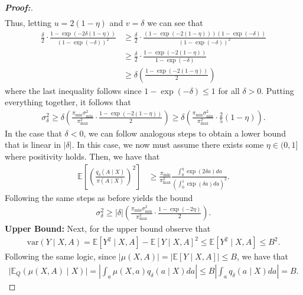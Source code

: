 \documentclass[11pt,twoside]{article}
\newcommand{\var}{\text{var}}
\theoremstyle{definition}
\theoremstyle{remark}
\begin{document}
\begin{proof}[\textbf{Proof:}]
\begin{align*}
\end{align*}
Thus, letting $u = 2(1 - \eta)$ and $v = \delta$ we can see that
\begin{align*}
    \frac{\delta}{2} \cdot \frac{1 - \exp(- 2 \delta(1 - \eta))}{(1 - \exp(- \delta))^2} &\geq \frac{\delta}{2} \cdot \frac{(1 - \exp(-2(1- \eta)))(1 - \exp(-\delta))}{(1 - \exp(- \delta))^2} \\
    &\geq \frac{\delta}{2} \cdot \frac{1 - \exp(-2(1- \eta))}{1 - \exp(- \delta)} \\
    &\geq  \delta \left( \frac{1 - \exp(-2(1- \eta))}{2} \right)
\end{align*}
where the last inequality follows since $1 - \exp(-\delta) \leq 1$ for all $\delta > 0$. Putting everything together, it follows that
\begin{align*}
    \sigma^2_\delta \geq \delta \left( \frac{\pi_{\min} \sigma^2_{\min}}{\pi^2_{\max}} \cdot  \frac{1 - \exp(-2(1- \eta))}{2} \right) \geq \delta \left( \frac{\pi_{\min} \sigma^2_{\min}}{\pi^2_{\max}} \cdot \frac{2}{5}(1 - \eta) \right).
\end{align*}
In the case that $\delta < 0$, we can follow analogous steps to obtain a lower bound that is linear in $|\delta|$. In this case, we now must assume there exists some $\eta \in (0, 1]$ where positivity holds. Then, we have that
\begin{align*}
     \mathbb{E}\left[\left(\frac{q_\delta(A \mid X)}{\pi(A \mid X)}\right)^2 \right] &\geq \frac{\pi_{\min}}{\pi^2_{\max}} \frac{\int^\eta_0 \exp(2 \delta a)da}{\left(\int^1_0 \exp(\delta a) da \right)^2}. 
\end{align*}
Following the same steps as before yields the bound
\begin{align*}
     \sigma^2_\delta \geq |\delta| \left( \frac{\pi_{\min} \sigma^2_{\min}}{\pi^2_{\max}} \cdot  \frac{1 - \exp(-2\eta )}{2} \right).
\end{align*}
\noindent \textbf{Upper Bound:} Next, for the upper bound observe that
\begin{align*}
    \var\left( Y \mid X, A \right) = \mathbb{E}\left[ Y^2 \mid X, A \right] - \mathbb{E}\left[ Y \mid X, A \right]^2 \leq \mathbb{E}\left[ Y^2 \mid X, A \right] \leq B^2.
\end{align*}
Following the same logic, since $|\mu(X, A)| = |\mathbb{E}[Y \mid X, A]|\leq B$, we have that
\begin{align*}
    \Big| \mathbb{E}_Q(\mu(X, A) \mid X) \Big| = \left|\int_a \mu(X, a) q_\delta(a \mid X)da \right| \leq  B \left| \int_a q_\delta(a \mid X)da \right| = B.

\end{align*}
\end{proof}
\end{document}
